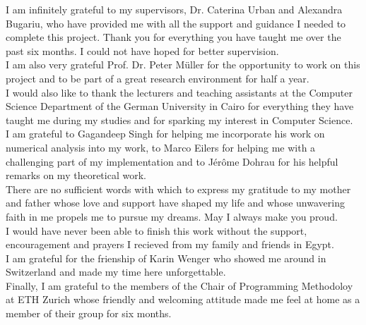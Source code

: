 I am infinitely grateful to my supervisors, Dr. Caterina Urban and Alexandra Bugariu, who have provided me with all the support and guidance I needed to complete this project. Thank you for everything you have taught me over the past six months. I could not have hoped for better supervision. \\

I am also very grateful Prof. Dr. Peter M{\"u}ller for the opportunity to work on this project and to be part of a great research environment for half a year. \\

I would also like to thank the lecturers and teaching assistants at the Computer Science Department of the German University in Cairo for everything they have taught me during my studies and for sparking my interest in Computer Science. \\

I am grateful to Gagandeep Singh for helping me incorporate his work on numerical analysis into my work, to Marco Eilers for helping me with a challenging part of my implementation and to J{\'e}r{\^o}me Dohrau for his helpful remarks on my theoretical work. \\

There are no sufficient words with which to express my gratitude to my mother and father whose love and support have shaped my life and whose unwavering faith in me propels me to pursue my dreams. May I always make you proud. \\

I would have never been able to finish this work without the support, encouragement and prayers I recieved from my family and friends in Egypt.\\ 

I am grateful for the frienship of Karin Wenger who showed me around in Switzerland and made my time here unforgettable. \\

Finally, I am grateful to the members of the Chair of Programming Methodoloy at ETH Zurich whose friendly and welcoming attitude made me feel at home as a member of their group for six months. \\

